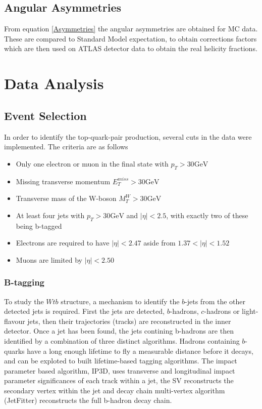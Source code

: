 \documentclass[12pt,a4paper]{article}
\numberwithin{equation}{section}
\begin{document}
\subsection{Angular Asymmetries}
From equation \eqref{Asymmetries} the angular asymmetries are obtained for MC data. These are compared to Standard Model expectation, to obtain corrections factors which are then used on ATLAS detector data to obtain the real helicity fractions.

\section{Data Analysis}


\subsection{Event Selection}\label{sec:cuts}
In order to identify the top-quark-pair production, several cuts in the data
were implemented. The criteria are as follows~\cite{oreach2020}
\begin{itemize}
	\item Only one electron or muon in the final state with $p_{T} > 30 \mathrm{GeV}$
	\item Missing transverse momentum $E_{T}^{miss} > 30 \mathrm{GeV}$
	\item Transverse mass of the W-boson $M_{T}^{W} > 30 \mathrm{GeV}$
	\item At least four jets with $p_{T} > 30 \mathrm{GeV}$ and $|\eta| < 2.5$, with exactly two of these being b-tagged
	\item Electrons are required to have $|\eta| < 2.47$ aside from $1.37 < |\eta| < 1.52$
	\item Muons are limited by $|\eta| < 2.50$
\end{itemize}

\subsubsection{B-tagging}
To study the $Wtb$ structure, a mechanism to identify the $b$-jets from the
other detected jets is required. First the jets are detected, $b$-hadrons,
$c$-hadrons or light-flavour jets, then their trajectories (tracks) are
reconstructed in the inner detector. Once a jet has been found, the jets
contining b-hadrons are then identified by a combination of three distinct
algorithms. Hadrons containing $b$-quarks have a long enough lifetime to fly a
measurable distance before it decays, and can be exploted to built
lifetime-based tagging algorithms. The impact parameter based algorithm, IP3D,
uses transverse and longitudinal impact parameter significances of each track
within a jet, the SV reconstructs the secondary vertex within the jet and decay
chain multi-vertex algorithm (JetFitter) reconstructs the full b-hadron
decay chain.\\
\end{document}
